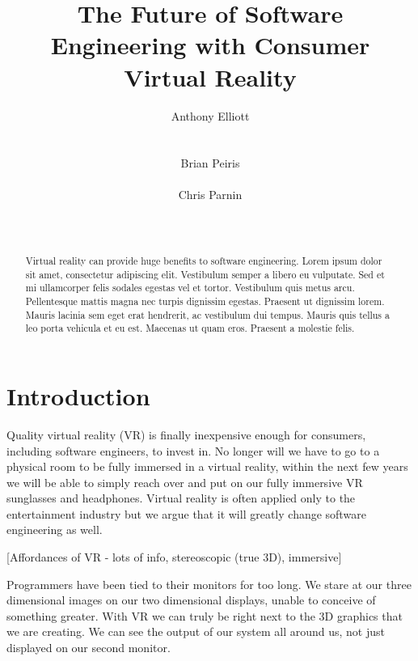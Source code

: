 \documentclass{acm_proc_article-sp}
\begin{document}
\title{The Future of Software Engineering with Consumer Virtual Reality}

\author{
\alignauthor
Anthony Elliott\\
       \\
       \\
\alignauthor
Brian Peiris\\
       \\
\alignauthor
Chris Parnin\\
       \\
       \\
}

\maketitle
\begin{abstract}
Virtual reality can provide huge benefits to software engineering.
Lorem ipsum dolor sit amet, consectetur adipiscing elit. Vestibulum semper a libero eu vulputate. Sed et mi ullamcorper felis sodales egestas vel et tortor. Vestibulum quis metus arcu. Pellentesque mattis magna nec turpis dignissim egestas. Praesent ut dignissim lorem. Mauris lacinia sem eget erat hendrerit, ac vestibulum dui tempus. Mauris quis tellus a leo porta vehicula et eu est. Maecenas ut quam eros. Praesent a molestie felis.
\end{abstract}

\section{Introduction}
Quality virtual reality (VR) is finally inexpensive enough for consumers, including software engineers, to invest in. No longer will we have to go to a physical room to be fully immersed in a virtual reality, within the next few years we will be able to simply reach over and put on our fully immersive VR sunglasses and headphones. Virtual reality is often applied only to the entertainment industry but we argue that it will greatly change software engineering as well. 

[Affordances of VR - lots of info, stereoscopic (true 3D), immersive]

Programmers have been tied to their monitors for too long. We stare at our three dimensional images on our two dimensional displays, unable to conceive of something greater. With VR we can truly be right next to the 3D graphics that we are creating. We can see the output of our system all around us, not just displayed on our second monitor.
\end{document}
